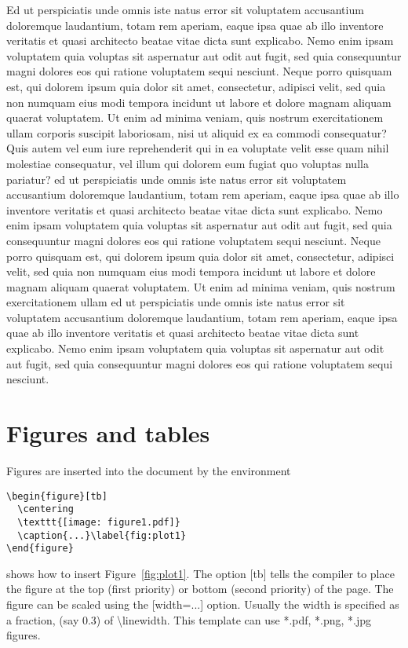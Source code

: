 \documentclass[10pt,a4paper,twoside]{article}
\begin{document}
Ed ut perspiciatis unde omnis iste natus error sit voluptatem accusantium doloremque laudantium, totam rem aperiam, eaque ipsa quae ab illo inventore veritatis et quasi architecto beatae vitae dicta sunt explicabo. Nemo enim ipsam voluptatem quia voluptas sit aspernatur aut odit aut fugit, sed quia consequuntur magni dolores eos qui ratione voluptatem sequi nesciunt. Neque porro quisquam est, qui dolorem ipsum quia dolor sit amet, consectetur, adipisci velit, sed quia non numquam eius modi tempora incidunt ut labore et dolore magnam aliquam quaerat voluptatem. Ut enim ad minima veniam, quis nostrum exercitationem ullam corporis suscipit laboriosam, nisi ut aliquid ex ea commodi consequatur? Quis autem vel eum iure reprehenderit qui in ea voluptate velit esse quam nihil molestiae consequatur, vel illum qui dolorem eum fugiat quo voluptas nulla pariatur? ed ut perspiciatis unde omnis iste natus error sit voluptatem accusantium doloremque laudantium, totam rem aperiam, eaque ipsa quae ab illo inventore veritatis et quasi architecto beatae vitae dicta sunt explicabo. Nemo enim ipsam voluptatem quia voluptas sit aspernatur aut odit aut fugit, sed quia consequuntur magni dolores eos qui ratione voluptatem sequi nesciunt. Neque porro quisquam est, qui dolorem ipsum quia dolor sit amet, consectetur, adipisci velit, sed quia non numquam eius modi tempora incidunt ut labore et dolore magnam aliquam quaerat voluptatem. Ut enim ad minima veniam, quis nostrum exercitationem ullam ed ut perspiciatis unde omnis iste natus error sit voluptatem accusantium doloremque laudantium, totam rem aperiam, eaque ipsa quae ab illo inventore veritatis et quasi architecto beatae vitae dicta sunt explicabo. Nemo enim ipsam voluptatem quia voluptas sit aspernatur aut odit aut fugit, sed quia consequuntur magni dolores eos qui ratione voluptatem sequi nesciunt. 

\section{Figures and tables}\label{sec:figures}
Figures are inserted into the document by the environment
\begin{verbatim}
\begin{figure}[tb]
  \centering
  \texttt{[image: figure1.pdf]}
  \caption{...}\label{fig:plot1}
\end{figure}	
\end{verbatim}
shows how to insert Figure~\ref{fig:plot1}. The option [{\ttfamily tb}] tells the compiler to place the figure at the top (first priority) or bottom (second priority) of the page. The figure can be scaled using the [{\ttfamily width}=...] option. Usually the width is specified as a fraction,  (say 0.3) of \textbackslash{\ttfamily linewidth}. This template can use *.pdf, *.png, *.jpg figures.
\end{document}
